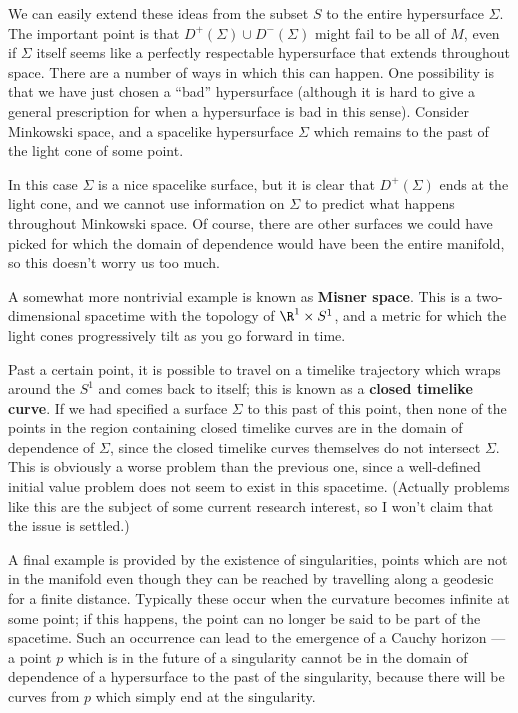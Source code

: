 We can easily extend these ideas from the subset $S$ to the entire
hypersurface $\Sigma$.  The important point is that $D^+(\Sigma)\cup 
D^-(\Sigma)$ might fail to be all of $M$, even if $\Sigma$ itself
seems like a perfectly respectable hypersurface that extends 
throughout space.  There are a number of ways in which this can
happen.  One possibility is that we have just chosen a ``bad''
hypersurface (although it is hard to give a general prescription for
when a hypersurface is bad in this sense).  Consider Minkowski space,
and a spacelike hypersurface $\Sigma$ which remains to the past of
the light cone of some point.

\begin{figure}[h]
  \centerline{
  }
\end{figure}

\noindent In this case $\Sigma$ is a nice spacelike surface, but
it is clear that $D^+(\Sigma)$ ends at the light cone, and we cannot
use information on $\Sigma$ to predict what happens throughout 
Minkowski space.  Of course, there are other surfaces we could have
picked for which the domain of dependence would have been the entire
manifold, so this doesn't worry us too much.

A somewhat more nontrivial example is known as {\bf Misner space}.
This is a two-dimensional spacetime with the topology of $\R^1\times
S^1$, and a metric for which the light cones progressively tilt as
you go forward in time.
\begin{figure}
  \centerline{
  }
\end{figure}
Past a certain point, it is possible to travel on a timelike
trajectory which wraps around the $S^1$ and comes back to itself; this
is known as a {\bf closed timelike curve}.  If we had specified a
surface $\Sigma$ to this past of this point, then none of the points
in the region containing closed timelike curves are in the domain of
dependence of $\Sigma$, since the closed timelike curves themselves
do not intersect $\Sigma$.  This is obviously a worse problem than
the previous one, since a well-defined initial value problem does not
seem to exist in this spacetime.  (Actually problems like this are
the subject of some current research interest, so I won't claim that
the issue is settled.)

A final example is provided by the existence of singularities, points
which are not in the manifold even though they can be reached by
travelling along a geodesic for a finite distance.  Typically these
occur when the curvature becomes infinite at some point; if this
happens, the point can no longer be said to be part of the spacetime.
Such an occurrence can lead to the emergence of a Cauchy horizon ---
a point $p$ which is in the future of a singularity cannot be in the
domain of dependence of a hypersurface to the past of the singularity,
because there will be curves from $p$ which simply end at the 
singularity.

